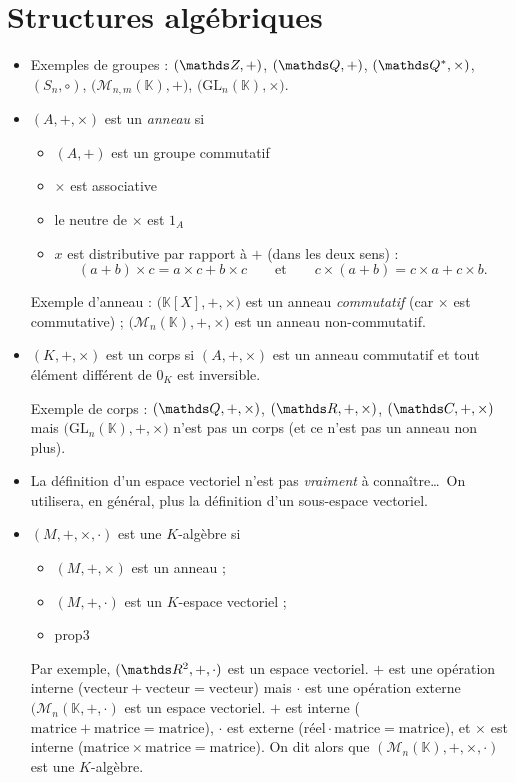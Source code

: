 \section{Structures algébriques}

\begin{rmkn}
	\begin{itemize}
		\item Exemples de groupes : $(\Z, +)$, $(\Q, +)$, $(\Q^*,\times)$, $(S_n,  \circ)$, $\big(\mathscr{M}_{n,m}(\mathds{K}), +\big)$, $\big(\mathrm{GL}_n(\mathds{K}),\times \big)$.
		\item $(A,+,\times)$\/ est un {\it anneau}\/ si
			\begin{itemize}
				\item $(A,+)$\/ est un groupe commutatif
				\item $\times $\/ est associative
				\item le neutre de $\times $\/ est $1_A$\/ 
				\item $x$\/ est distributive par rapport à $+$\/ (dans les deux sens) : \[
							(a+b)\times c = a \times c + b \times c
							\qquad\text{et}\qquad c \times (a+b) = c \times a + c \times b
					.\]
			\end{itemize}
			Exemple d'anneau : $\big(\mathds{K}[X], +, \times\big)$ est un anneau {\it commutatif}\/ (car $\times $\/ est commutative) ;  $\big(\mathscr{M}_{n}(\mathds{K}), + , \times \big)$\/ est un anneau non-commutatif.
		\item $(K, +, \times)$\/ est un corps si $(A, +, \times)$\/ est un anneau commutatif et tout élément différent de $0_K$\/ est inversible.

			Exemple de corps : $(\Q, +, \times)$, $(\R, +, \times)$, $(\C, +, \times)$ {\color{red}\sc mais} $\big(\mathrm{GL}_n(\mathds{K}), +, \times\big)$\/ n'est pas un corps (et ce n'est pas un anneau non plus).
		\item La définition d'un espace vectoriel n'est pas {\it vraiment}\/ à connaître\ldots\ On utilisera, en général, plus la définition d'un sous-espace vectoriel.
		\item $(M, +, \times, \cdot)$\/ est une $K$-algèbre si
			\begin{itemize}
				\item $(M, +, \times)$\/ est un anneau ;
				\item $(M, +, \cdot)$\/ est un $K$-espace vectoriel ;
				\item prop3
			\end{itemize}
			Par exemple, $(\R^2, +, \cdot)$\/ est un espace vectoriel. $+$\/ est une opération interne ($\mathrm{vecteur}+\mathrm{vecteur}=\mathrm{vecteur}$) mais $\cdot$\/ est une opération externe $(\mathscr{M}_n(\mathds{K}, +, \cdot)$\/ est un espace vectoriel. $+$\/ est interne ($\mathrm{matrice} + \mathrm{matrice} = \mathrm{matrice}$), $\cdot$\/ est externe ($\mathrm{réel} \cdot \mathrm{matrice} = \mathrm{matrice}$), et $\times $\/ est interne ($\mathrm{matrice} \times \mathrm{matrice} = \mathrm{matrice}$). On dit alors que $(\mathscr{M}_{n}(\mathds{K}), +, \times ,\cdot)$\/ est une $K$-algèbre.
	\end{itemize}
\end{rmkn}

